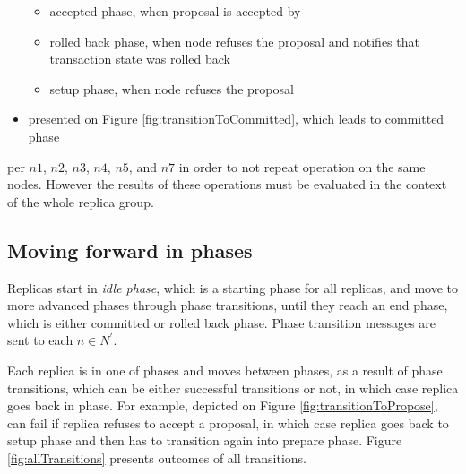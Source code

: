 \begin{itemize}
	\begin{itemize}
		\item accepted phase, when proposal is accepted by 
		\item rolled back phase, when node  refuses the proposal and notifies that transaction state \txState was rolled back
		\item setup phase, when node  refuses the proposal
	\end{itemize}
\item \commitTransition presented on Figure \ref{fig:transitionToCommitted}, which leads to committed phase
\end{itemize}

















 per $n1$, $n2$, $n3$, $n4$, $n5$, and $n7$ in order to not repeat operation on the same nodes. However the results of
 these operations must be evaluated in the context of the whole replica group.


\subsection{Moving forward in phases}
Replicas start in \emph{idle phase}, which is a starting phase for all replicas, and move to more advanced phases through phase transitions, until they reach an end phase, which is either committed or rolled back phase. Phase transition messages are sent to each $n\in \mathit{N}^'$.

Each replica is in one of phases and moves between phases, as a result of phase transitions, which can be either successful transitions or not, in which case replica goes back in phase. 
For example, \proposeTransition depicted on Figure \ref{fig:transitionToPropose}, can fail if replica refuses to accept a proposal, in which case replica goes back to setup phase and then has to transition again into prepare phase. Figure \ref{fig:allTransitions} presents outcomes of all transitions.


